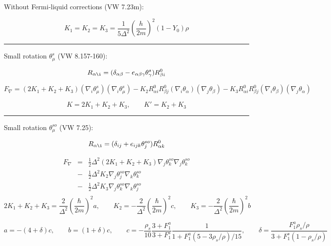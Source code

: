 \documentclass[a4paper]{article}
\begin{document}
Without Fermi-liquid corrections (VW 7.23m):

$$
K_1=K_2=K_3 = \frac{1}{5\Delta^2} \left(\frac{h}{2m}\right)^2 (1-Y_0)\rho
$$

\eject
\hrule
\medskip

Small rotation $\theta^s_\mu$ (VW 8.157-160):

$$
R_{\alpha\i} = (\delta_{\alpha\beta} - e_{\alpha\beta \gamma}\theta^s_\gamma)
R^0_{\beta i}
$$

$$
F_\nabla =
(2K_1+K_2+K_3) (\nabla_i\theta^s_\mu) (\nabla_i\theta^s_\mu)
-K_2 R^0_{\alpha i}R^0_{\beta j}(\nabla_i\theta_\alpha)(\nabla_j\theta_\beta)
-K_3 R^0_{\alpha i}R^0_{\beta j}(\nabla_i\theta_\beta) (\nabla_j\theta_\alpha)
$$

$$
K=2K_1+K_2+K_3,\qquad K'=K_2+K_3
$$

\hrule
\medskip

Small rotation $\theta^{so}_\mu$ (VW 7.25):

$$
R_{\alpha\i} = (\delta_{ij} + e_{ijk}\theta^{so}_j) R^0_{\alpha k}
$$

\begin{eqnarray*}
F_\nabla
&=& \frac12 \Delta^2 (2 K_1 + K_2 + K_3)
\nabla_j\theta^{so}_k \nabla_j\theta^{so}_k\\
&-& \frac12 \Delta^2 K_2
\nabla_j\theta^{so}_j \nabla_k\theta^{so}_k\\
&-& \frac12 \Delta^2 K_3
\nabla_j\theta^{so}_k \nabla_k\theta^{so}_j\\
\end{eqnarray*}
$$
2 K_1 + K_2 + K_3 = \frac{2}{\Delta^2}\left(\frac{\hbar}{2m}\right)^2 a,
\qquad
K_2 = -\frac{2}{\Delta^2}\left(\frac{\hbar}{2m}\right)^2 c,
\qquad
K_3 = -\frac{2}{\Delta^2}\left(\frac{\hbar}{2m}\right)^2 b
$$

$$
a=-(4+\delta)c,\qquad
b= (1+\delta)c,\qquad
c=-\frac{\rho_s}{10}
\frac{3+F_1^a}{3+F_1^s}
\frac{1}{1+F_1^a(5-3\rho_s/\rho)/15}
,\qquad
\delta = \frac{F_1^a \rho_s/\rho}{3+F_1^s(1-\rho_s/\rho)}
$$
\end{document}
